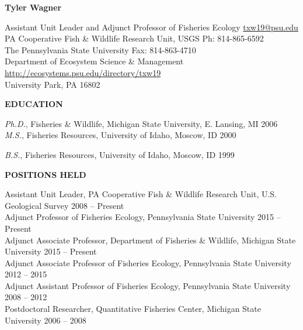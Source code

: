 \documentclass[10pt]{article}
\begin{document}
\centerline {\bf{\Large Tyler Wagner}}
\vspace{8pt}
\begin{flushleft}
Assistant Unit Leader and Adjunct Professor of Fisheries Ecology \hfill \href{mailto:txw19@psu.edu}{txw19@psu.edu}\\
PA Cooperative Fish \& Wildlife Research Unit, USGS \hfill Ph: 814-865-6592\\
 The Pennsylvania State University  \hfill Fax: 814-863-4710\\
 Department of Ecosystem Science \& Management \hfill  \url{http://ecosystems.psu.edu/directory/txw19}\\
University Park, PA 16802\\


\vspace{8pt}

\centerline {\bf{EDUCATION}}

\vspace{5pt}
{\sl Ph.D.}, 
Fisheries \& Wildlife, 
Michigan State University, E. Lansing, MI \hfill 2006 \\ 
\vspace{5pt}
{\sl M.S.}, Fisheries Resources,
University of Idaho, Moscow, ID \hfill 2000

\vspace{5pt}

{\sl B.S.}, Fisheries Resources,
University of Idaho, Moscow, ID \hfill 1999

\vspace{8pt}
\centerline {\bf{POSITIONS HELD}}
\vspace{5pt}
Assistant Unit Leader, PA Cooperative Fish \& Wildlife Research Unit, U.S. Geological Survey \hfill 2008 -- Present \\
Adjunct Professor of Fisheries Ecology, Pennsylvania State University  \hfill 2015 -- Present \\
Adjunct Associate Professor, Department of Fisheries \& Wildlife, Michigan State University \hfill 2015 -- Present \\
Adjunct Associate Professor of Fisheries Ecology, Pennsylvania State University  \hfill 2012 -- 2015 \\
Adjunct Assistant Professor of Fisheries Ecology, Pennsylvania State University  \hfill 2008 -- 2012 \\
Postdoctoral Researcher, Quantitative Fisheries Center, Michigan State University \hfill 2006 -- 2008 \\


\end{flushleft}
\end{document}
